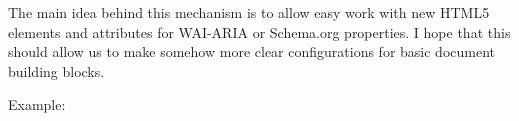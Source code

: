 The main idea behind this mechanism is to allow easy work with new HTML5
elements and attributes for WAI-ARIA or Schema.org properties. I hope that
this should allow us to make somehow more clear configurations for basic
document building blocks.

Example:


\begin{texsource}



{\NoFonts{}}
{\EndNoFonts}

{}
{\NoFonts{}}
{\EndNoFonts}
\end{texsource}






